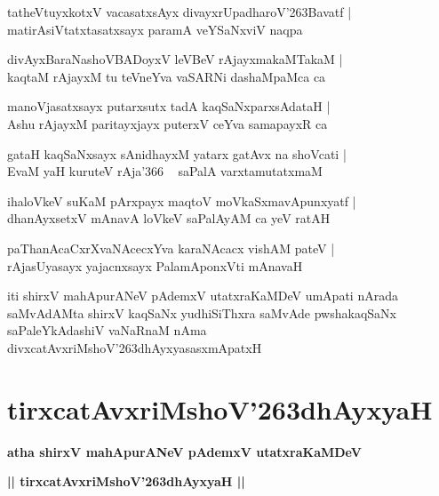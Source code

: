 \documentclass[twoside,12pt,openright]{book}
\def\S{\char'263}
\newcounter{shloka}[chapter]
\begin{document}
\begin{shloka}%
tatheVtuyxkotxV vacasatxsAyx divayxrUpadharoV\S Bavatf |\\
matirAsiVtatxtasatxsayx paramA veYSaNxviV naqpa 
\end{shloka}

\begin{shloka}%
divAyxBaraNashoVBADoyxV leVBeV rAjayxmakaMTakaM |\\
kaqtaM rAjayxM tu teVneYva vaSARNi dashaMpaMca ca 
\end{shloka}

\begin{shloka}%
manoVjasatxsayx putarxsutx tadA kaqSaNxparxsAdataH |\\
Ashu rAjayxM paritayxjayx puterxV ceYva samapayxR ca 
\end{shloka}

\begin{shloka}%
gataH kaqSaNxsayx sAnidhayxM yatarx gatAvx na shoVcati |\\
EvaM yaH kuruteV rAja\char'366 ~ saPalA varxtamutatxmaM 
\end{shloka}

\begin{shloka}%
ihaloVkeV suKaM pArxpayx maqtoV moVkaSxmavApunxyatf |\\
dhanAyxsetxV mAnavA loVkeV saPalAyAM ca yeV ratAH 
\end{shloka}

\begin{shloka}%
paThanAcaCxrXvaNAcecxYva karaNAcacx vishAM pateV |\\
rAjasUyasayx yajacnxsayx PalamAponxVti mAnavaH
\end{shloka}

\begin{center}
iti shirxV mahApurANeV pAdemxV utatxraKaMDeV umApati nArada saMvAdAMta 
shirxV kaqSaNx yudhiSiThxra saMvAde pwshakaqSaNx saPaleYkAdashiV 
vaNaRnaM nAma divxcatAvxriMshoV\S dhAyxyasasxmApatxH
\end{center}

\chapter{tirxcatAvxriMshoV\S dhAyxyaH}

\begin{center}
{\LARGE\bfseries atha shirxV mahApurANeV pAdemxV utatxraKaMDeV}
\end{center}

\begin{center}
{\LARGE\bfseries || tirxcatAvxriMshoV\S dhAyxyaH ||}
\end{center}
\end{document}
